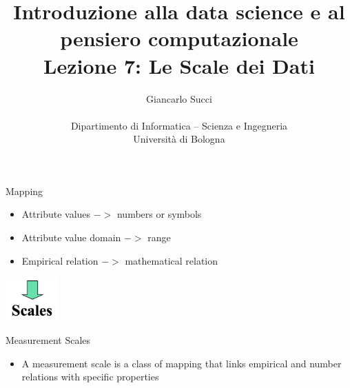 \documentclass{beamer}
\title[L02]{Introduzione alla data science e al pensiero computazionale\\
Lezione 7: Le Scale dei Dati} %
\author[{\tiny Giancarlo Succi }]{Giancarlo Succi\\\\ Dipartimento di Informatica -- Scienza e Ingegneria\\Universit\`{a} di Bologna\\
\bftt{g.succi@unibo.it}
} %
\institute[unibo] %
\date{} %
\begin{document}
\begin{frame}
\titlepage %

\end{frame}





\begin{frame}{\centerline{Mapping}}

\begin{itemize}
\item Attribute values \(->\) numbers or symbols
\item Attribute value domain \(->\) range
\item Empirical relation \(->\) mathematical relation\\
\end{itemize}
\begin{center}
\includegraphics[width=20mm]{A2022.ScaleDeiDati/img-img14.png}
\end{center}

\end{frame}

\begin{frame}{\centerline{Measurement Scales}}

\begin{itemize}
\item A measurement scale is a class of mapping that links empirical and number relations with specific properties
\end{itemize}

\end{frame}
\end{document}
